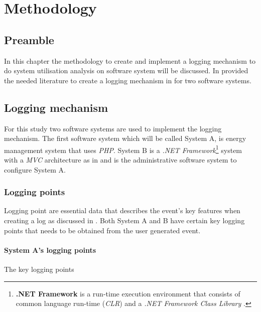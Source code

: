 \chapter{Methodology}
\label{chap:2}

\section{Preamble}
In this chapter the methodology to create and implement a logging mechanism to do system utilisation analysis on software system will be discussed. In  provided the needed literature to create a logging mechanism in  for two software systems.

\section{Logging mechanism}\label{sec:Ch3_LoggingMechanism}
For this study two software systems are used to implement the logging mechanism. The first software system which will be called System A, is energy management system that uses \emph{PHP}. System B is a \emph{.NET Framework}\footnote{\label{ftn:NetFramework}\textbf{.NET Framework} is a run-time execution environment that consists of common language run-time (\emph{CLR}) and a \emph{.NET Framework Class Library} \cite{Harkness2007}.} system with a \emph{MVC} architecture as in  and is the administrative software system to configure System A.

\subsection{Logging points}
Logging point are essential data that describes the event's key features when creating a log as discussed in . Both System A and B have certain key logging points that needs to be obtained from the user generated event.

\subsubsection{System A's logging points}

The key logging points

